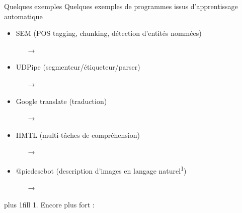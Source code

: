 \documentclass[hyperref={unicode}, xcolor={svgnames}, french]{beamer}
\begin{document}
\begin{frame}{Quelques exemples}
    Quelques exemples de programmes issus d'apprentissage automatique
    \begin{itemize}
        \item SEM (POS tagging, chunking, détection d'entités nommées)
            \begin{itemize}
                \item[→] 
            \end{itemize}
        \item UDPipe (segmenteur/étiqueteur/parser)
            \begin{itemize}
                \item[→] 
            \end{itemize}
        \item Google translate (traduction)
            \begin{itemize}
                \item[→] 
            \end{itemize}
        \item HMTL (multi-tâches de compréhension)
            \begin{itemize}
                \item[→] 
            \end{itemize}
        \item @picdescbot (description d'images en langage naturel\textsuperscript{1})
            \begin{itemize}
                \item[→] 
            \end{itemize}
    \end{itemize}
    \vskip0pt plus 1fill
    {\tiny 1. Encore plus fort :  \parencite{alishahi2017encoding}}
\end{frame}

\end{document}
